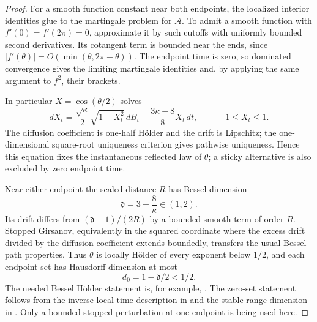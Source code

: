 \begin{proof}
For a smooth function constant near both endpoints, the localized
interior identities glue to the martingale problem for
$\mathcal A$.  To admit a smooth function with
$f'(0)=f'(2\pi)=0$, approximate it by such cutoffs with uniformly
bounded second derivatives.  Its cotangent term is bounded near the
ends, since $|f'(\theta)|=O(\min(\theta,2\pi-\theta))$.
The endpoint time is zero, so dominated convergence gives the limiting
martingale identities and, by applying the same argument to $f^2$,
their brackets.

In particular $X=\cos(\theta/2)$ solves
\begin{equation}\label{tree:jacobi}
 dX_t=\frac{\sqrt\kappa}{2}\sqrt{1-X_t^2}\,dB_t
           -\frac{3\kappa-8}{8}X_t\,dt,
 \qquad -1\le X_t\le1.
\end{equation}
The diffusion coefficient is one-half H\"older and the drift is
Lipschitz; the one-dimensional square-root uniqueness criterion gives
pathwise uniqueness.  Hence this equation fixes the instantaneous
reflected law of $\theta$; a sticky alternative is also excluded by
zero endpoint time.

Near either endpoint the scaled distance $R$ has Bessel dimension
\begin{equation}\label{tree:bessel-dimension}
 \mathfrak d=3-\frac8\kappa\in(1,2).
\end{equation}
Its drift differs from $(\mathfrak d-1)/(2R)$ by a bounded smooth
term of order $R$.  Stopped Girsanov, equivalently in the squared
coordinate where the excess drift divided by the diffusion coefficient
extends boundedly, transfers the usual Bessel path properties.  Thus
$\theta$ is locally H\"older of every exponent below $1/2$, and each
endpoint set has Hausdorff dimension at most
\begin{equation}\label{tree:zero-dimension}
 d_0=1-\mathfrak d/2<1/2.
\end{equation}
The needed Bessel H\"older statement is, for example,
\citet[Theorem~1.2 and Corollary~2.14]{HutzenthalerJentzenNoll2014}.
The zero-set statement follows from the inverse-local-time description
in \citet[Exercise~XI.1.25]{RevuzYor1999} and the stable-range dimension
in \citet[Theorem~III.15]{Bertoin1996}.  Only a bounded stopped
perturbation at one endpoint is being used here.


\end{proof}
